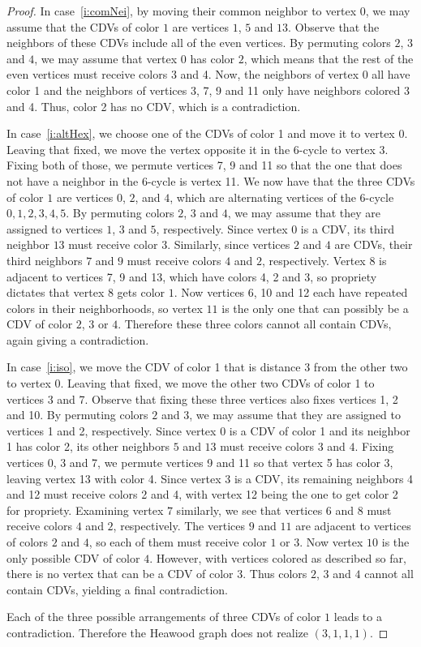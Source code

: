 \documentclass{article}
\theoremstyle{definition}
\begin{document}
\begin{proof}
In case~\ref{i:comNei},
by moving their common neighbor to vertex $0$,
we may assume that the CDVs of color $1$ are vertices $1$, $5$ and $13$.
Observe that the neighbors of these CDVs include all of the even vertices.
By permuting colors $2$, $3$ and $4$, we may assume that vertex $0$ has color $2$, which means that the rest of the even vertices must receive colors 3 and 4.
Now, the neighbors of vertex 0 all have color 1 and the neighbors of vertices 3, 7, 9 and 11 only have neighbors colored 3 and 4.
Thus, color 2 has no CDV, which is a contradiction.

In case~\ref{i:altHex},
we choose one of the CDVs of color 1 and move it to vertex 0.
Leaving that fixed, we move the vertex opposite it in the 6-cycle to vertex 3.
Fixing both of those, we permute vertices 7, 9 and 11 so that the one that does not have a neighbor in the 6-cycle is vertex 11.
We now have that the three CDVs of color $1$ are vertices $0$, $2$, and $4$, which are alternating vertices of the $6$-cycle $0,1,2,3,4,5$. 
By permuting colors $2$, $3$ and $4$, we may assume that they are assigned to vertices $1$, $3$ and $5$, respectively.
Since vertex $0$ is a CDV, its third neighbor $13$ must receive color $3$. 
Similarly, since vertices $2$ and $4$ are CDVs, their third neighbors $7$ and $9$ must receive colors $4$ and $2$, respectively. 
Vertex $8$ is adjacent to vertices 7, 9 and 13, which have colors 4, 2 and 3, so
propriety dictates that vertex $8$ gets color $1$.
Now vertices 6, 10 and 12 each have repeated colors in their neighborhoods, so vertex $11$ is the only one that can possibly be a CDV of color $2$, $3$ or $4$. 
Therefore these three colors cannot all contain CDVs, again giving a contradiction.

In case~\ref{i:iso},
we move the CDV of color 1 that is distance 3 from the other two to vertex 0.
Leaving that fixed, we move the other two CDVs of color 1 to vertices 3 and 7.
Observe that fixing these three vertices also fixes vertices 1, 2 and 10.
By permuting colors $2$ and $3$, we may assume that they are assigned to vertices 1 and 2, respectively.
Since vertex $0$ is a CDV of color 1 and its neighbor 1 has color 2, its other neighbors $5$ and $13$ must receive colors $3$ and $4$.
Fixing vertices 0, 3 and 7, we permute vertices 9 and 11 so that vertex 5 has color 3, leaving vertex 13 with color 4.
Since vertex $3$ is a CDV, its remaining neighbors 4 and 12 must receive colors 2 and 4, with vertex 12 being the one to get color 2 for propriety.
Examining vertex $7$ similarly, we see that vertices $6$ and $8$ must receive colors $4$ and $2$, respectively.
The vertices $9$ and $11$ are adjacent to vertices of colors $2$ and $4$, so each of them must receive color $1$ or $3$.
Now vertex $10$ is the only possible CDV of color $4$.
However, with vertices colored as described so far, there is no vertex that can be a CDV of color $3$.
Thus colors $2$, $3$ and $4$ cannot all contain CDVs, yielding a final contradiction.

Each of the three possible arrangements of three CDVs of color $1$ leads to a contradiction. Therefore the Heawood graph does not realize $(3,1,1,1)$.
\end{proof}
\end{document}
